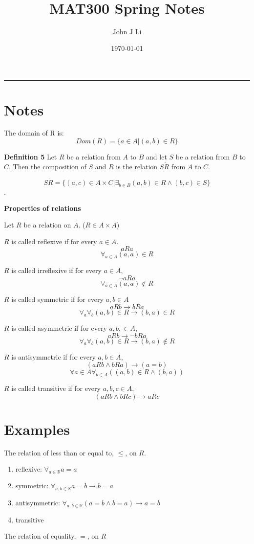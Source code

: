 \documentclass{article}
\title{MAT300 Spring Notes}
\date{\today}
\author{John J Li}
\begin{document}
    \maketitle
    \thispagestyle{empty}
    \noindent\rule{\textwidth}{0.8pt}

    \section*{Notes}

    The domain of R is:
    \[Dom(R)=\{a\in A|(a,b) \in R\}\]

    \textbf{Definition 5} Let $R$ be a relation from $A$ to $B$ and let $S$ be a relation from
    $B$ to $C$. Then the composition of $S$ and $R$ is the relation $S\dot R$ from $A$ to $C$.

    \[S\dot R=\{(a,c)\in A\times C|\exists_{b\in B}(a,b)\in R \land (b,c)\in S\}\].

    \textbf{Properties of relations}

    Let $R$ be a relation on $A$. ($R\in A\times A$)

    $R$ is called reflexive if for every $a\in A$. 
    \[aRa\]
    \[\forall_{a\in A} (a,a)\in R\]

    $R$ is called irreflexive if for every $a\in A$, 
    \[\neg aRa\]
    \[\forall_{a\in A} (a,a)\notin R\]

    $R$ is called symmetric if for every $a,b\in A$
    \[aRb\rightarrow bRa\]
    \[\forall_a\forall_b(a,b)\in R\rightarrow (b,a)\in R\]

    $R$ is called asymmetric if for every $a,b,\in A$,
    \[aRb\rightarrow\neg bRa\]
    \[\forall_a\forall_b(a,b)\in R\rightarrow (b,a)\notin R\]
    
    $R$ is antisymmetric if for every $a,b\in A$,
    \[(aRb\land bRa)\rightarrow(a=b)\] 
    \[\forall{a\in A}\forall_{b\in A}((a,b)\in R\land (b,a))\]

    $R$ is called transitive if for every $a,b,c\in A$,
    \[(aRb\land bRc)\rightarrow aRc\]



    \section*{Examples}

    The relation of less than or equal to, $\leq$, on $R$.

    \begin{enumerate}
        \item reflexive: $\forall_{a\in\mathbb{R}} a=a$
        \item symmetric: $\forall_{a,b\in\mathbb{R}} a=b\rightarrow b=a$
        \item antisymmetric: $\forall_{a,b\in\mathbb{R}} (a=b\land b=a)\rightarrow a=b$
        \item transitive
    \end{enumerate}


    The relation of equality, $=$, on $R$

    
\end{document}
